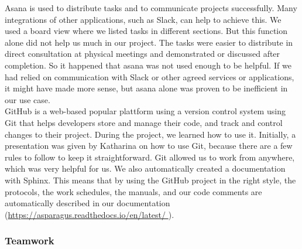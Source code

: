 Asana is used to distribute tasks and to communicate projects successfully. Many integrations of other applications, such as Slack, can help to achieve this. We used a board view where we listed tasks in different sections. But this function alone did not help us much in our project. The tasks were easier to distribute in direct consultation at physical meetings and demonstrated or discussed after completion. So it happened that asana was not used enough to be helpful. If we had relied on communication with Slack or other agreed services or applications, it might have made more sense, but asana alone was proven to be inefficient in our use case. \\
GitHub is a web-based popular plattform using a version control system using Git that helps developers store and manage their code, and track and control changes to their project. During the project, we learned how to use it. Initially, a presentation was given by Katharina on how to use Git, because there are a few rules to follow to keep it straightforward. Git allowed us to work from anywhere, which was very helpful for us. We also automatically created a documentation with Sphinx. This means that by using the GitHub project in the right style, the protocols, the work schedules, the manuals, and our code comments are automatically described in our documentation (\url{https://asparagus.readthedocs.io/en/latest/ }).


\subsubsection{Teamwork}

